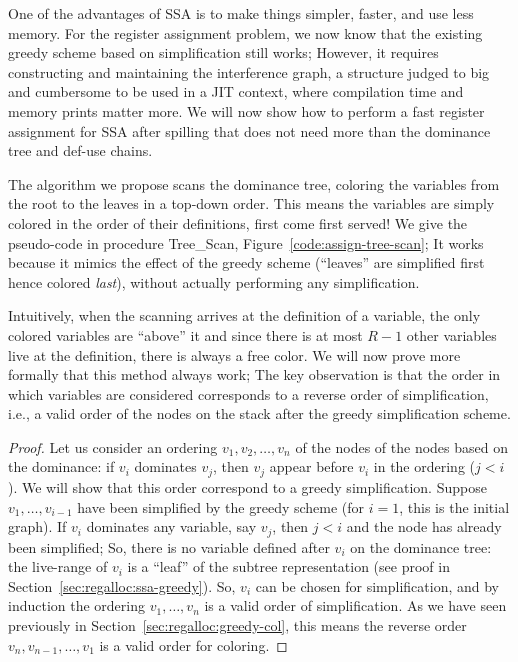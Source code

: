 {One of the advantages of SSA is to make things simpler, faster, and use less memory. 
For the register assignment problem, we now know that the existing greedy scheme based on simplification still works; 
However, it requires constructing and maintaining the interference graph, a structure judged to big and cumbersome to be used in a JIT context, where compilation time and memory prints matter more. 
We will now show how to perform a fast register assignment for SSA after spilling that does not need more than the dominance tree and def-use chains. 

The algorithm we propose scans the dominance tree, coloring the variables from the root to the leaves in a top-down order.
This means the variables are simply colored in the order of their definitions, first come first served!
We give the pseudo-code in procedure Tree\_Scan, Figure~\ref{code:assign-tree-scan}; It works because it mimics the effect of the greedy scheme (``leaves'' are simplified first hence colored \emph{last}), without actually performing any simplification.

Intuitively, when the scanning arrives at the definition of a variable, the only colored variables are ``above'' it and since there is at most $R-1$ other variables live at the definition, there is always a free color.
We will now prove more formally that this method always work;
The key observation is that the order in which variables are considered corresponds to a reverse order of simplification, i.e., a valid order of the nodes on the stack after the greedy simplification scheme.

\begin{proof}
  \def\order{o}
  Let us consider an ordering $v_1, v_2, \ldots, v_n$ of the nodes of the nodes based on the dominance:
  if $v_i$ dominates $v_j$, then $v_j$ appear before $v_i$ in the ordering ($j < i$).
  We will show that this order correspond to a greedy simplification.
  Suppose $v_1, \ldots, v_{i-1}$ have been simplified by the greedy scheme (for $i=1$, this is the initial graph).
  If $v_i$ dominates any variable, say $v_j$, then $j < i$ and the node has already been simplified;
  So, there is no variable defined after $v_i$ on the dominance tree:
  the live-range of $v_i$ is a ``leaf'' of the subtree representation (see proof in Section~\ref{sec:regalloc:ssa-greedy}).
  So, $v_i$ can be chosen for simplification, and by induction the ordering $v_1, \ldots, v_n$ is a valid order of simplification. 
  As we have seen previously in Section~\ref{sec:regalloc:greedy-col}, this means the reverse order $v_n, v_{n-1}, \ldots, v_1$ is a valid order for coloring.
\end{proof}


}
